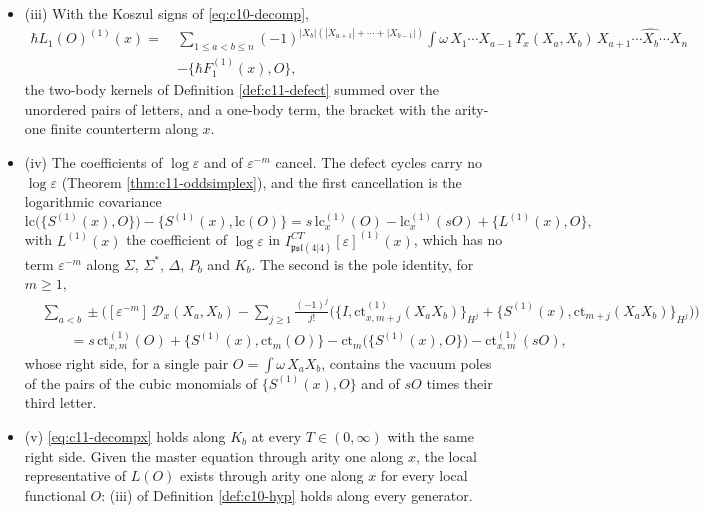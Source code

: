 \begin{theorem}
\begin{itemize}
\item (iii) With the Koszul signs of \eqref{eq:c10-decomp},
\begin{equation}
\begin{aligned}
\hbar L_1(O)^{(1)}(x)=\ &\sum_{1\le a<b\le n}(-1)^{|X_b|(|X_{a+1}|+\cdots+|X_{b-1}|)}\int\omega\,X_1\cdots X_{a-1}\,\Upsilon_x(X_a,X_b)\,X_{a+1}\cdots\widehat{X_b}\cdots X_n\\
&-\big\{\hbar F_1^{(1)}(x),O\big\},
\end{aligned}
\label{eq:c11-decompx}
\end{equation}
the two-body kernels of Definition \ref{def:c11-defect} summed over the unordered pairs of letters, and a one-body term, the bracket with the arity-one finite counterterm along $x$.
\item (iv) The coefficients of $\log\varepsilon$ and of $\varepsilon^{-m}$ cancel. The defect cycles carry no $\log\varepsilon$ (Theorem \ref{thm:c11-oddsimplex}), and the first cancellation is the logarithmic covariance
\begin{equation}
\mathrm{lc}\big(\{S^{(1)}(x),O\}\big)-\big\{S^{(1)}(x),\mathrm{lc}(O)\big\}=s\,\mathrm{lc}^{(1)}_x(O)-\mathrm{lc}^{(1)}_x(sO)+\big\{L^{(1)}(x),O\big\},
\label{eq:c11-logcov}
\end{equation}
with $L^{(1)}(x)$ the coefficient of $\log\varepsilon$ in $I^{CT}_{\mathfrak{psl}(4|4)}[\varepsilon]^{(1)}(x)$, which has no term $\varepsilon^{-m}$ along $\Sigma$, $\Sigma^*$, $\Delta$, $P_b$ and $K_b$. The second is the pole identity, for $m\ge1$,
\begin{equation}
\begin{aligned}
&\sum_{a<b}\pm\Big([\varepsilon^{-m}]\,\mathcal D_x(X_a,X_b)-\sum_{j\ge1}\tfrac{(-1)^j}{j!}\Big(\big\{I,\mathrm{ct}^{(1)}_{x,m+j}(X_aX_b)\big\}_{H^j}+\big\{S^{(1)}(x),\mathrm{ct}_{m+j}(X_aX_b)\big\}_{H^j}\Big)\Big)\\
&\qquad=s\,\mathrm{ct}^{(1)}_{x,m}(O)+\big\{S^{(1)}(x),\mathrm{ct}_m(O)\big\}-\mathrm{ct}_m\big(\{S^{(1)}(x),O\}\big)-\mathrm{ct}^{(1)}_{x,m}(sO),
\end{aligned}
\label{eq:c11-pole}
\end{equation}
whose right side, for a single pair $O=\int\omega\,X_aX_b$, contains the vacuum poles of the pairs of the cubic monomials of $\{S^{(1)}(x),O\}$ and of $sO$ times their third letter.
\item (v) \eqref{eq:c11-decompx} holds along $K_b$ at every $T\in(0,\infty)$ with the same right side. Given the master equation through arity one along $x$, the local representative of $L(O)$ exists through arity one along $x$ for every local functional $O$: (iii) of Definition \ref{def:c10-hyp} holds along every generator.
\end{itemize}
\end{theorem}

